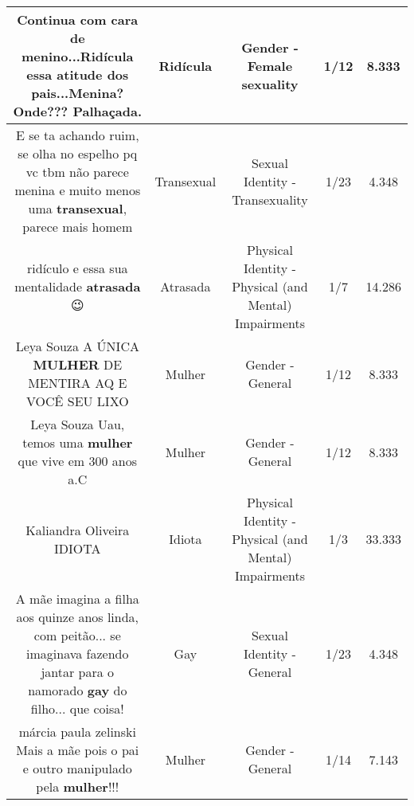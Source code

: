\documentclass[11pt]{article}
\newlength\mylength
\begin{document}
\begin{center}
\begin{longtable}{|C{.65\mylength}|C{.30\mylength}|C{.12\mylength}|C{.12\mylength}|C{.12\mylength}|}
  \small Continua com cara de menino...\textbf{Ridícula} essa atitude dos pais...Menina? Onde??? Palhaçada.\normalsize   & Ridícula & Gender - Female sexuality & 1/12 & 8.333 \\  \hline
  \small E se ta achando ruim, se olha no espelho pq vc tbm não parece menina e muito menos uma \textbf{transexual}, parece mais homem\normalsize   & Transexual & Sexual Identity - Transexuality & 1/23 & 4.348 \\  \hline
  \small ridículo e essa sua mentalidade \textbf{atrasada} 😉\normalsize   & Atrasada & Physical Identity - Physical (and Mental) Impairments & 1/7 & 14.286 \\  \hline
  \small Leya Souza A ÚNICA \textbf{MULHER} DE MENTIRA AQ E VOCÊ SEU LIXO\normalsize   & Mulher & Gender - General & 1/12 & 8.333 \\  \hline
  \small Leya Souza Uau, temos uma \textbf{mulher} que vive em 300 anos a.C\normalsize   & Mulher & Gender - General & 1/12 & 8.333 \\  \hline
  \small Kaliandra Oliveira IDIOTA\normalsize   & Idiota & Physical Identity - Physical (and Mental) Impairments & 1/3 & 33.333 \\  \hline
  \small A mãe imagina a filha aos quinze anos linda, com peitão... se imaginava fazendo jantar para o namorado \textbf{gay} do filho... que coisa!\normalsize   & Gay & Sexual Identity - General & 1/23 & 4.348 \\  \hline
  \small márcia paula zelinski Mais a mãe pois o pai e outro manipulado pela \textbf{mulher}!!!\normalsize   & Mulher & Gender - General & 1/14 & 7.143 \\  \hline

\end{longtable}
\end{center}
\end{document}
